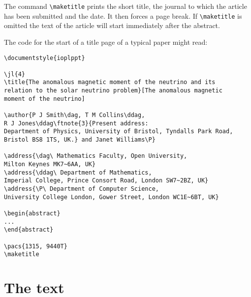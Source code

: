 The command \verb"\maketitle" prints the short title,
the journal to which the article has been submitted and the date. It then
forces a page break. If \verb"\maketitle" is omitted the text of the
article will
start immediately after the abstract.


The code for the start of a title page of a typical paper might read:
\begin{verbatim}
\documentstyle{ioplppt}

\jl{4}
\title{The anomalous magnetic moment of the neutrino and its
relation to the solar neutrino problem}[The anomalous magnetic
moment of the neutrino]

\author{P J Smith\dag, T M Collins\ddag,
R J Jones\ddag\ftnote{3}{Present address:
Department of Physics, University of Bristol, Tyndalls Park Road,
Bristol BS8 1TS, UK.} and Janet Williams\P}

\address{\dag\ Mathematics Faculty, Open University,
Milton Keynes MK7~6AA, UK}
\address{\ddag\ Department of Mathematics,
Imperial College, Prince Consort Road, London SW7~2BZ, UK}
\address{\P\ Department of Computer Science,
University College London, Gower Street, London WC1E~6BT, UK}

\begin{abstract}
...
\end{abstract}

\pacs{1315, 9440T}
\maketitle
\end{verbatim}

\section{The text}
